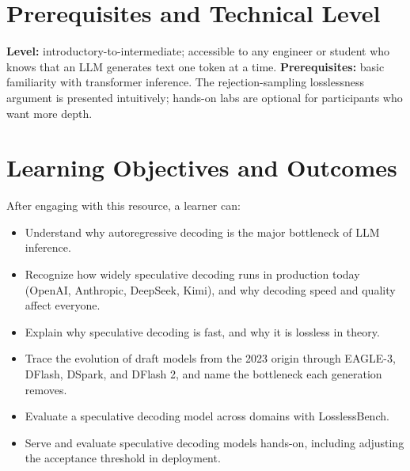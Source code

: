 \documentclass{article}
\begin{document}
\section{Prerequisites and Technical Level}
\textbf{Level:} introductory-to-intermediate; accessible to any engineer or student who knows that an LLM generates text one token at a time. \textbf{Prerequisites:} basic familiarity with transformer inference. The rejection-sampling losslessness argument is presented intuitively; hands-on labs are optional for participants who want more depth.

\section{Learning Objectives and Outcomes}
After engaging with this resource, a learner can:
\begin{itemize}
  \item Understand why autoregressive decoding is the major bottleneck of LLM inference.
  \item Recognize how widely speculative decoding runs in production today (OpenAI, Anthropic, DeepSeek, Kimi), and why decoding speed and quality affect everyone.
  \item Explain why speculative decoding is fast, and why it is lossless in theory.
  \item Trace the evolution of draft models from the 2023 origin through EAGLE-3, DFlash, DSpark, and DFlash 2, and name the bottleneck each generation removes.
  \item Evaluate a speculative decoding model across domains with LosslessBench.
  \item Serve and evaluate speculative decoding models hands-on, including adjusting the acceptance threshold in deployment.
\end{itemize}
\end{document}
